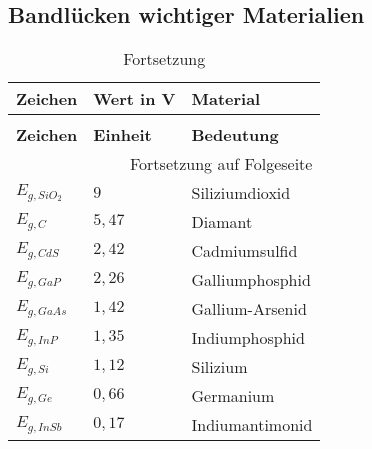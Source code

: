 \documentclass[12pt,a4paper]{report}%
\numberwithin{equation}{section}
\begin{document}
	\subsection{Bandlücken wichtiger Materialien} \label{ch:gaps}
	\renewcommand{\arraystretch}{1.5}
	\begin{longtable} {|p{2cm}|p{3cm}|p{8.4cm}|} \hline
	\textbf{Zeichen} & \textbf{Wert in \text{e}V} & \textbf{Material} \\
	\hline
	\endfirsthead %
	\caption{Fortsetzung}\\ \hline
	\textbf{Zeichen} & \textbf{Einheit} & \textbf{Bedeutung} \\
	\hline
	\endhead %
	\multicolumn{3}{r}{Fortsetzung auf Folgeseite}\\
	\endfoot
	\hline
	\endlastfoot
	$E_{g,SiO_2}$ & $9$ & Siliziumdioxid \\ \hline
	$E_{g,C}$ & $5,47$ & Diamant \\ \hline
	$E_{g,CdS}$ & $2,42$ & Cadmiumsulfid \\ \hline
	$E_{g,GaP}$ & $2,26$ & Galliumphosphid \\ \hline
	$E_{g,GaAs}$ & $1,42$ & Gallium-Arsenid \\ \hline
	$E_{g,InP}$ & $1,35$ & Indiumphosphid \\ \hline
	$E_{g,Si}$ & $1,12$ & Silizium \\ \hline
	$E_{g,Ge}$ & $0,66$ & Germanium \\ \hline
	$E_{g,InSb}$ & $0,17$ & Indiumantimonid \\ \hline
	\end{longtable}
	\renewcommand{\arraystretch}{1}
	
\end{document}
